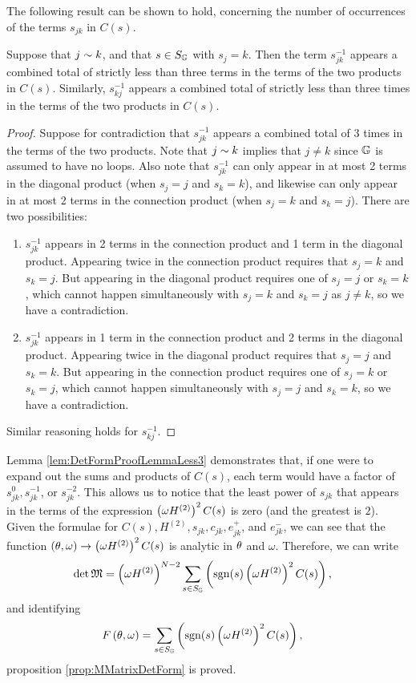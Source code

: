 The following result can be shown to hold, concerning the number of occurrences of the terms $s_{jk}$ in $C(s)$.
\begin{lemma} \label{lem:DetFormProofLemmaLess3}
	Suppose that $j\sim k$, and that $s\in S_{\mathbb{G}}$ with $s_j = k$.
	Then the term $s_{jk}^{-1}$ appears a combined total of strictly less than three terms in the terms of the two products in $C(s)$.
	Similarly, $s_{kj}^{-1}$ appears a combined total of strictly less than three times in the terms of the two products in $C(s)$.
\end{lemma}
\begin{proof}
	Suppose for contradiction that $s_{jk}^{-1}$ appears a combined total of 3 times in the terms of the two products.
	Note that $j\sim k$ implies that $j\neq k$ since $\mathbb{G}$ is assumed to have no loops.
	Also note that $s_{jk}^{-1}$ can only appear in at most 2 terms in the diagonal product (when $s_j=j$ and  $s_k=k$), and likewise can only appear in at most 2 terms in the connection product (when $s_j=k$ and $s_k=j$).
	There are two possibilities:
	\begin{enumerate}
		\item $s_{jk}^{-1}$ appears in 2 terms in the connection product and 1 term in the diagonal product.
		Appearing twice in the connection product requires that $s_j=k$ and $s_k=j$.
		But appearing in the diagonal product requires one of $s_j=j$ or $s_k=k$, which cannot happen simultaneously with $s_j=k$ and $s_k=j$ as $j\neq k$, so we have a contradiction.
		\item $s_{jk}^{-1}$ appears in 1 term in the connection product and 2 terms in the diagonal product.
		Appearing twice in the diagonal product requires that $s_j=j$ and $s_k=k$.
		But appearing in the connection product requires one of $s_j=k$ or $s_k=j$, which cannot happen simultaneously with $s_j=j$ and $s_k=k$, so we have a contradiction.
	\end{enumerate}
	Similar reasoning holds for $s_{kj}^{-1}$.
\end{proof}
Lemma \ref{lem:DetFormProofLemmaLess3} demonstrates that, if one were to expand out the sums and products of $C(s)$, each term would have a factor of $s_{jk}^{0}, s_{jk}^{-1}$, or $s_{jk}^{-2}$.
This allows us to notice that the least power of $s_{jk}$ that appears in the terms of the expression $\left(  \omega H^{(2)}  \right)^2 C(s)$ is zero (and the greatest is $2$).
Given the formulae for $C(s), H^{(2)}, s_{jk}, c_{jk}, e_{jk}^+$, and $e_{jk}^-$, we can see that the function $\left( \theta, \omega \right)\rightarrow\left(  \omega H^{(2)}  \right)^2 C(s)$ is analytic in $\theta$ and $\omega$.
Therefore, we can write
\begin{align*}
	\det\mathfrak{M} &= \left(  \omega H^{(2)}  \right)^{N-2} \sum_{s\in S_{\mathbb{G}}} \left(  \mathrm{sgn}(s) \left(  \omega H^{(2)}  \right)^2 C(s)  \right),
\end{align*}
and identifying
\begin{align*}
	F\left( \theta, \omega \right) &= \sum_{s\in S_{\mathbb{G}}} \left(  \mathrm{sgn}(s) \left(  \omega H^{(2)}  \right)^2 C(s)  \right),
\end{align*}
proposition \ref{prop:MMatrixDetForm} is proved.